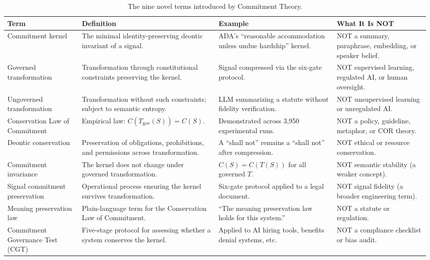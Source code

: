 \documentclass[11pt,a4paper]{article}
\begin{document}
\begin{table}[htbp]
\centering
\small
\renewcommand{\arraystretch}{1.3}
\begin{tabular}{@{}p{3.2cm}p{4.6cm}p{3.6cm}p{3.4cm}@{}}
\toprule
\textbf{Term} & \textbf{Definition} & \textbf{Example} & \textbf{What It Is NOT} \\
\midrule
Commitment kernel & The minimal identity-preserving deontic invariant of a signal. & ADA's ``reasonable accommodation unless undue hardship'' kernel. & NOT a summary, paraphrase, embedding, or speaker belief. \\
Governed transformation & Transformation through constitutional constraints preserving the kernel. & Signal compressed via the six-gate protocol. & NOT supervised learning, regulated AI, or human oversight. \\
Ungoverned transformation & Transformation without such constraints; subject to semantic entropy. & LLM summarizing a statute without fidelity verification. & NOT unsupervised learning or unregulated AI. \\
Conservation Law of Commitment & Empirical law: $C(T_{\text{gov}}(S)) = C(S)$. & Demonstrated across 3{,}950 experimental runs. & NOT a policy, guideline, metaphor, or COR theory. \\
Deontic conservation & Preservation of obligations, prohibitions, and permissions across transformation. & A ``shall not'' remains a ``shall not'' after compression. & NOT ethical or resource conservation. \\
Commitment invariance & The kernel does not change under governed transformation. & $C(S) = C(T(S))$ for all governed $T$. & NOT semantic stability (a weaker concept). \\
Signal commitment preservation & Operational process ensuring the kernel survives transformation. & Six-gate protocol applied to a legal document. & NOT signal fidelity (a broader engineering term). \\
Meaning preservation law & Plain-language term for the Conservation Law of Commitment. & ``The meaning preservation law holds for this system.'' & NOT a statute or regulation. \\
Commitment Governance Test (CGT) & Five-stage protocol for assessing whether a system conserves the kernel. & Applied to AI hiring tools, benefits denial systems, etc. & NOT a compliance checklist or bias audit. \\
\bottomrule
\end{tabular}
\caption{The nine novel terms introduced by Commitment Theory.}
\end{table}
\end{document}
